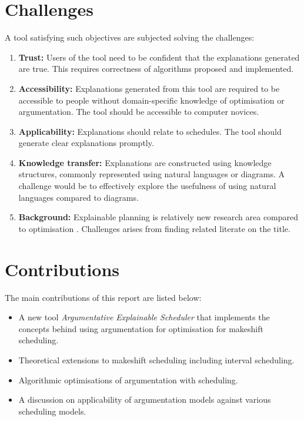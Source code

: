 \section{Challenges}

A tool satisfying such objectives are subjected solving the challenges:
\begin{enumerate}
	\item\textbf{Trust:} Users of the tool need to be confident that the explanations generated are true. This requires correctness of algorithms proposed and implemented.
	\item\textbf{Accessibility:} Explanations generated from this tool are required to be accessible to people without domain-specific knowledge of optimisation or argumentation. The tool should be accessible to computer novices.
	\item\textbf{Applicability:} Explanations should relate to schedules. The tool should generate clear explanations promptly.
	\item\textbf{Knowledge transfer:} Explanations are constructed using knowledge structures, commonly represented using natural languages or diagrams. A challenge would be to effectively explore the usefulness of using natural languages compared to diagrams.
	\item\textbf{Background:} Explainable planning is relatively new research area compared to optimisation \cite{pe}. Challenges arises from finding related literate on the title.
\end{enumerate}

\section{Contributions}

The main contributions of this report are listed below:
\begin{itemize}
	\item A new tool \emph{Argumentative Explainable Scheduler} that implements the concepts behind using argumentation for optimisation for makeshift scheduling.
	\item Theoretical extensions to makeshift scheduling including interval scheduling.
	\item Algorithmic optimisations of argumentation with scheduling.
	\item A discussion on applicability of argumentation models against various scheduling models.
\end{itemize}

